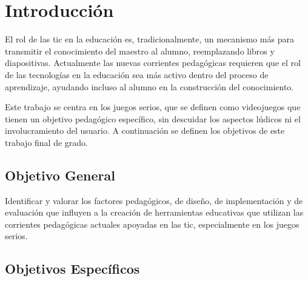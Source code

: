 
\section{Introducción}

El rol de las \gls{tic} en la educación es, tradicionalmente, un mecanismo más
para transmitir el conocimiento del maestro al alumno, reemplazando libros y
diapositivas\cite{laptop:instructionism}. Actualmente las nuevas corrientes
pedagógicas requieren que el rol de las tecnologías en la educación sea más
activo dentro del proceso de aprendizaje, ayudando incluso al alumno en la
construcción del conocimiento.

Este trabajo se centra en los juegos serios, que se definen como videojuegos que
tienen un objetivo pedagógico específico, sin descuidar los aspectos lúdicos ni
el involucramiento del usuario\cite{sg:aoverview,ludus:sg,abt1987serious}. A
continuación se definen los objetivos de este trabajo final de grado.

\subsection{Objetivo General}

Identificar y valorar los factores pedagógicos, de diseño, de implementación y
de evaluación que influyen a la creación de herramientas educativas que utilizan
las corrientes pedagógicas actuales apoyadas en las \gls{tic}, especialmente en
los juegos serios. 

\subsection{Objetivos Específicos}

